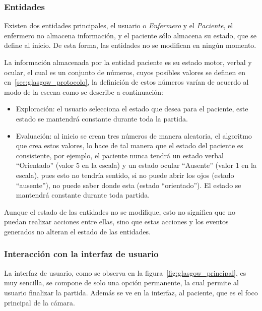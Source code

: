 \subsubsection{Entidades}


Existen dos entidades principales, el usuario o \emph{Enfermero} y el \emph{Paciente}, 
el enfermero no almacena información, y el
paciente sólo almacena su estado, que se define al inicio. De esta forma, las
entidades no se modifican en ningún momento.

La información almacenada por la entidad paciente es su estado motor, verbal y
ocular, el cual es un conjunto de números, cuyos posibles valores se definen en
en~\ref{sec:glasgow_protocolo}, la definición de estos números varían de acuerdo
al modo de la escena como se describe a continuación:

\begin{itemize}
    \item Exploración: el usuario selecciona el estado que desea para el paciente, 
        este estado se mantendrá constante durante toda la partida.
    \item Evaluación: al inicio se crean tres números de manera
        aleatoria, el algoritmo que crea estos valores, lo hace de tal manera
        que el estado del paciente es consistente, por ejemplo, el paciente
        nunca tendrá un estado verbal \enquote{Orientado} (valor 5 en la escala)
        y un estado ocular \enquote{Ausente} (valor 1 en la escala), pues esto
        no tendría sentido, si no puede abrir los ojos (estado
        \enquote{ausente}), no puede saber donde esta (estado
        \enquote{orientado}). El estado se mantendrá constante durante toda partida.
\end{itemize}

Aunque el estado de las entidades no se modifique, esto no significa que no
puedan realizar acciones entre ellas, sino que estas acciones y los eventos
generados no alteran el estado de las entidades.


\subsubsection{Interacción con la interfaz de usuario} 

La interfaz de usuario, como se observa en la figura~\ref{fig:glasgow_principal}, es
muy sencilla, se compone de solo una opción permanente, la cual permite al
usuario finalizar la partida. Además se ve en la interfaz, al paciente, que es el 
foco principal de la cámara.

